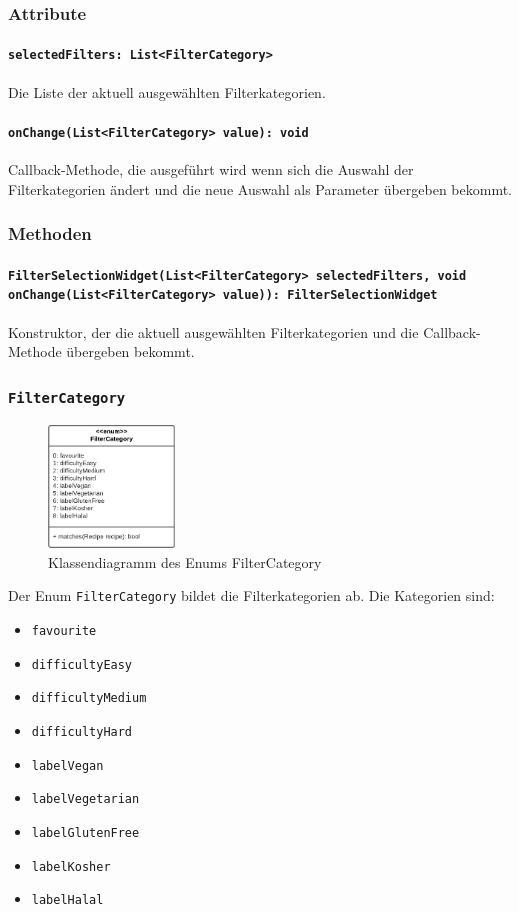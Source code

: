 \documentclass{entwurfsheft}
\begin{document}
\begin{sloppypar}
\subsubsection*{Attribute}
\paragraph{\texttt{selectedFilters: List<FilterCategory>}}
Die Liste der aktuell ausgewählten Filterkategorien.
\paragraph{\texttt{onChange(List<FilterCategory> value): void}} Callback-Methode, die ausgeführt wird wenn sich die Auswahl der Filterkategorien ändert und die neue Auswahl als Parameter übergeben bekommt.
\subsubsection*{Methoden}
\paragraph{\texttt{FilterSelectionWidget(List<FilterCategory> selectedFilters, void onChange(List<FilterCategory> value)): FilterSelectionWidget}}
Konstruktor, der die aktuell ausgewählten Filterkategorien und die Callback-Methode übergeben bekommt.
\newpage

\subsubsection{\texttt{FilterCategory}}
\label{sec:filterCategory}
\begin{figure}
    [htp]
    \centering
    \includegraphics[width=0.3\textwidth]{images/presentationLayer/classDiagrams/filterCategory.pdf}
    \caption{Klassendiagramm des Enums Filter\-Category}
\end{figure}
Der Enum \texttt{FilterCategory} bildet die Filterkategorien ab. Die Kategorien sind:
\begin{itemize}
    \item \texttt{favourite}
    \item \texttt{difficultyEasy}
    \item \texttt{difficultyMedium}
    \item \texttt{difficultyHard}
    \item \texttt{labelVegan}
    \item \texttt{labelVegetarian}
    \item \texttt{labelGlutenFree}
    \item \texttt{labelKosher}
    \item \texttt{labelHalal}
\end{itemize}

\end{sloppypar}
\end{document}
